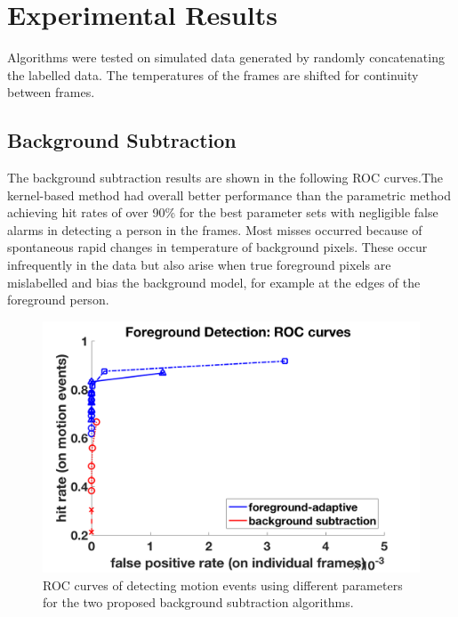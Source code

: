 \documentclass[12pt,oneside]{article} %
\begin{document}
\section{Experimental Results}  %
Algorithms were tested on simulated data generated by randomly concatenating the labelled data.
The temperatures of the frames are shifted for continuity between frames. 

\subsection{Background Subtraction}  %
The background subtraction results are shown in the following ROC curves.The kernel-based method
had overall better performance than the parametric method achieving hit rates of over 90\% for the best
parameter sets with negligible false alarms in detecting a person in the frames. Most misses occurred
because of spontaneous rapid changes in temperature of background pixels. These occur infrequently
in the data but also arise when true foreground pixels are mislabelled and bias the background model, for 
example at the edges of the foreground person.

\begin{figure}[htb]
\centering
\includegraphics[scale=0.52]{images/roc.png}
\caption{ROC curves of detecting motion events using different parameters for the two proposed
background subtraction algorithms.}
\label{roc}
\end{figure}
\end{document}
